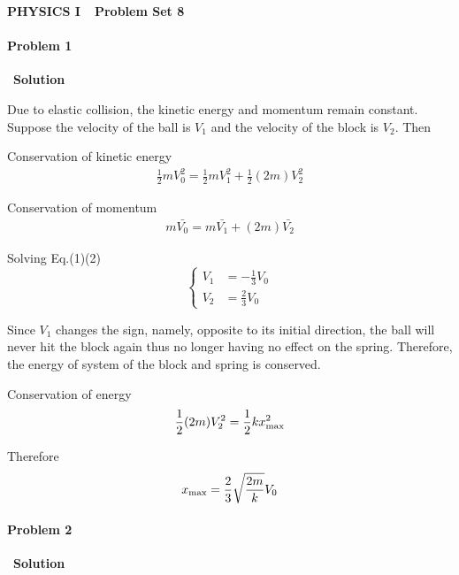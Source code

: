 \documentclass[12pt,a4paper]{article}
\begin{document}
\centerline{\Huge{{\textbf{PHYSICS I\ \ Problem Set 8}}}}
\vspace{0.5cm}
\paragraph{\large \textbf{Problem 1}}~{\textbf{Solution}}
\vspace{2mm}

Due to elastic collision, the kinetic energy and momentum remain constant. Suppose the
velocity of the ball is $V_1$ and the velocity of the block is $V_2$. Then

Conservation of kinetic energy
\begin{align}
    \frac{1}{2}mV_0^2 = \frac{1}{2}mV_1^2 + \frac{1}{2}(2m)V_2^2
\end{align}

Conservation of momentum
\begin{align}
    m\bar{V_0} = m\bar{V_1} + (2m)\bar{V_2}
\end{align}

Solving Eq.(1)(2)
\begin{equation}
    \left\lbrace
        \begin{aligned}
            V_1 &= -\frac{1}{3}V_0\\
            V_2 &= \frac{2}{3}V_0
        \end{aligned}
    \right.
\end{equation}

Since $V_1$ changes the sign, namely, opposite to its initial direction, the ball will
never hit the block again thus no longer having no effect on the spring. Therefore, the
energy of system of the block and spring is conserved.

Conservation of energy
\begin{align}
    \frac{1}{2}(2m)V_2^2 = \frac{1}{2}kx_{\rm max}^2
\end{align}

Therefore
\begin{align}
    x_{\rm max} = \frac{2}{3}\sqrt{\frac{2m}{k}}V_0
\end{align}

\paragraph{\large \textbf{Problem 2}}~{\textbf{Solution}}
\vspace{2mm}
\end{document}
